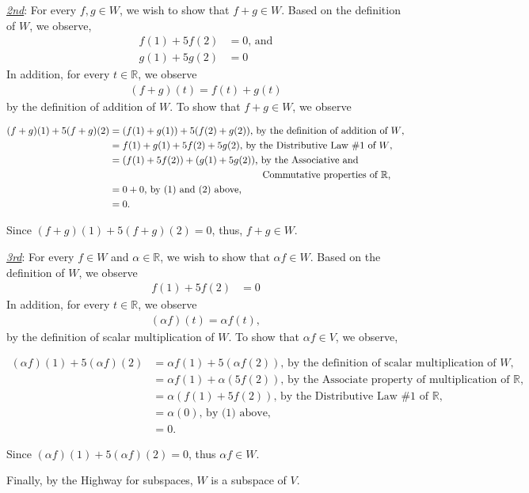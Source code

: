 \documentclass[12pt,answers]{exam}
\begin{document}
\begin{solution}
\begin{enumerate}[label=(\alph*)]
	\underline{\textit{2nd}}: For every $f,g \in W$, we wish to show that $f+g\in W$. Based on the definition of $W$, we observe,
	\begin{align}
		f(1)+5f(2) &= 0 \text{, and} \\
		g(1)+5g(2) &= 0	
	\end{align}
	In addition, for every $t\in\mathbb{R}$, we observe
	\begin{align*}
		(f+g)(t)=f(t)+g(t)
	\end{align*}
	by the definition of addition of $W$. 
	To show that $f+g\in W$, we observe
	\begin{footnotesize}
	\begin{align*}
		(f+g)(1)+5(f+g)(2) &= (f(1)+g(1))+5(f(2)+g(2)) \text{, by the definition of addition of $W$,} \\
		&= f(1)+g(1)+5f(2)+5g(2) \text{, by the Distributive Law \#1 of $W$, } \\
		&= (f(1)+5f(2))+(g(1)+5g(2)) \text{, by the Associative and } \\ &\hspace{5.5 cm}{\text{Commutative properties of $\mathbb{R}$,}} \\
		&= 0 + 0 \text{, by (1) and (2) above,} \\
		&=0.
	\end{align*}
	\end{footnotesize}
	Since $(f+g)(1)+5(f+g)(2)=0$, thus, $f+g\in W$. 
	
	\underline{\textit{3rd}}: For every $f\in W$ and $\alpha\in \mathbb{R}$, we wish to show that $\alpha f\in W$. Based on the definition of $W$, we observe
	\begin{align}
		f(1)+5f(2) &= 0
	\end{align}
	In addition, for every $t\in\mathbb{R}$, we observe
	\begin{align*}
		(\alpha f)(t)=\alpha f(t),
	\end{align*}
	by the definition of scalar multiplication of $W$. To show that $\alpha f\in V$, we observe,
	\begin{small}
	\begin{align*}
		(\alpha f)(1)+5(\alpha f)(2) &= \alpha f(1)+5(\alpha f(2)) \text{, by the definition of scalar multiplication of $W$,} \\
		&= \alpha f(1)+\alpha(5f(2)) \text{, by the Associate property of multiplication of $\mathbb{R}$,} \\
		&= \alpha (f(1)+5f(2)) \text{, by the Distributive Law \#1 of $\mathbb{R}$,} \\
		&= \alpha (0) \text{, by (1) above,} \\
		&= 0.
	\end{align*}
	\end{small}
	Since $(\alpha f)(1)+5(\alpha f)(2)=0$, thus $\alpha f \in W$.
	
	Finally, by the Highway for subspaces, $W$ is a subspace of $V$. 
\end{enumerate}
\end{solution}
\end{document}
